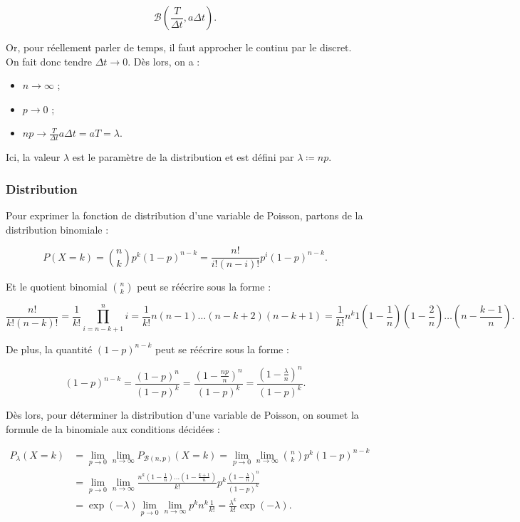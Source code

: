 \documentclass{article}
\begin{document}
		\[\mathcal B(\frac T{\Delta t}, a\Delta t).\]

		Or, pour réellement parler de temps, il faut approcher le continu par le discret. On fait donc tendre $\Delta t \to 0$. Dès lors, on a :

		\begin{itemize}
			\item $n \to \infty$ ;
			\item $p \to 0$ ;
			\item $np \to \frac T{\Delta t}a\Delta t = aT = \lambda$.
		\end{itemize}

		Ici, la valeur $\lambda$ est le paramètre de la distribution et est défini par $\lambda \coloneqq np$.

		\subsubsection{Distribution}
			Pour exprimer la fonction de distribution d'une variable de Poisson, partons de la distribution binomiale :

			\[P(X=k) = \binom nkp^k(1-p)^{n-k} = \frac {n!}{i!(n-i)!}p^i(1-p)^{n-k}.\]

			Et le quotient binomial $\binom nk$ peut se réécrire sous la forme :

			\[\frac {n!}{k!(n-k)!} = \frac 1{k!}\prod_{i=n-k+1}^ni = \frac 1{k!}n(n-1)\ldots(n-k+2)(n-k+1) = \frac 1{k!}n^k1(1-\frac 1n)(1-\frac 2n)\ldots(n-\frac {k-1}n).\]

			De plus, la quantité $(1-p)^{n-k}$ peut se réécrire sous la forme :

			\[(1-p)^{n-k} = \frac {(1-p)^n}{(1-p)^k} = \frac {(1-\frac {np}n)^n}{(1-p)^k} = \frac {(1-\frac \lambda n)^n}{(1-p)^k}.\]

			Dès lors, pour déterminer la distribution d'une variable de Poisson, on soumet la formule de la binomiale aux conditions décidées :

			\[\begin{aligned}
				P_\lambda(X=k) &= \lim_{p \to 0}\lim_{n\to\infty}P_{\mathcal B(n, p)}(X=k) = \lim_{p \to 0}\lim_{n \to \infty}\binom nkp^k(1-p)^{n-k} \\
				&= \lim_{p \to 0}\lim_{n \to \infty}\frac {n^k(1-\frac 1n)\ldots(1-\frac {k+1}n)}{k!}p^k\frac {(1-\frac \lambda n)^n}{(1-p)^k} \\
				&= \exp(-\lambda)\lim_{p \to 0}\lim_{n \to \infty}p^kn^k\frac 1{k!} = \frac {\lambda^k}{k!}\exp(-\lambda).
			\end{aligned}\]
\end{document}
